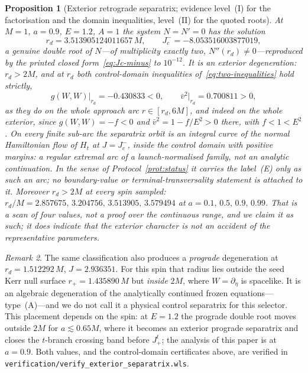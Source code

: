 \documentclass[12pt]{iopart}
\theoremstyle{plain}
\newtheorem{proposition}{Proposition}
\theoremstyle{definition}
\theoremstyle{remark}
\newtheorem{remark}[proposition]{Remark}
\newcommand{\rp}{r_{+}}
\begin{document}
\begin{proposition}[Exterior retrograde separatrix; evidence level~(I) for the
factorisation and the domain inequalities, level~(II) for the quoted roots]
\label{prop:exterior-sep}
At $M=1$, $a=0.9$, $E=1.2$, $A=1$ the system $N=N'=0$ has the solution
\begin{equation}
    r_d=3.513905124011657\,M,\qquad J_c^{-}=-8.053516003877019 ,
    \label{eq:exterior-sep}
\end{equation}
a genuine double root of $N$---of multiplicity exactly two, $N''(r_d)\neq0$---reproduced
by the printed closed form~\eqref{eq:Jc-minus} to $10^{-12}$. It is an \emph{exterior} degeneration:
$r_d>2M$, and at $r_d$ both control-domain inequalities
of~\eqref{eq:two-inequalities} hold strictly,
\begin{equation}
    g(W,W)\big|_{r_d}=-0.430833<0,
    \qquad \bar v^2\big|_{r_d}=0.700811>0 ,
\end{equation}
as they do on the whole approach arc $r\in[r_d,6M]$, and indeed on the whole exterior,
since $g(W,W)=-f<0$ and $\bar v^2=1-f/E^2>0$ there, with $f<1<E^2$. On every finite
sub-arc the separatrix orbit is an integral curve of the normal Hamiltonian flow of
$H_t$ at $J=J_c^-$, inside the control domain with positive margins: a regular extremal
arc of a launch-normalised family, not an analytic continuation. In the sense of
Protocol~\ref{prot:status} it carries the label~(E) only as such an arc; no
boundary-value or terminal-transversality statement is attached to it. Moreover $r_d>2M$ at every spin sampled:
$r_d/M=2.857675,\,3.204756,\,3.513905,\,3.579494$ at
$a=0.1,\,0.5,\,0.9,\,0.99$. That is a scan of four values, not a proof over the
continuous range, and we claim it as such; it does indicate that the exterior
character is not an accident of the representative parameters.
\end{proposition}

\begin{remark}
\label{rmk:prograde-inner}
The same classification also produces a \emph{prograde} degeneration at
$r_d=1.512292\,M$, $J=2.936351$. For this spin that radius lies outside the seed
Kerr null surface $\rp=1.435890\,M$ but \emph{inside} $2M$, where
$W=\partial_\eta$ is spacelike. It is an algebraic degeneration of the
analytically continued frozen equations---type~(A)---and we do not call it a
physical control separatrix for this selector. This placement depends on the spin: at
$E=1.2$ the prograde double root moves outside $2M$ for $a\lesssim0.65M$, where it becomes an
exterior prograde separatrix and closes the $t$-branch crossing band before $J_+^t$; the
analysis of this paper is at $a=0.9$. Both values, and the
control-domain certificates above, are verified in
\texttt{verification/verify\_exterior\_separatrix.wls}.
\end{remark}
\end{document}
